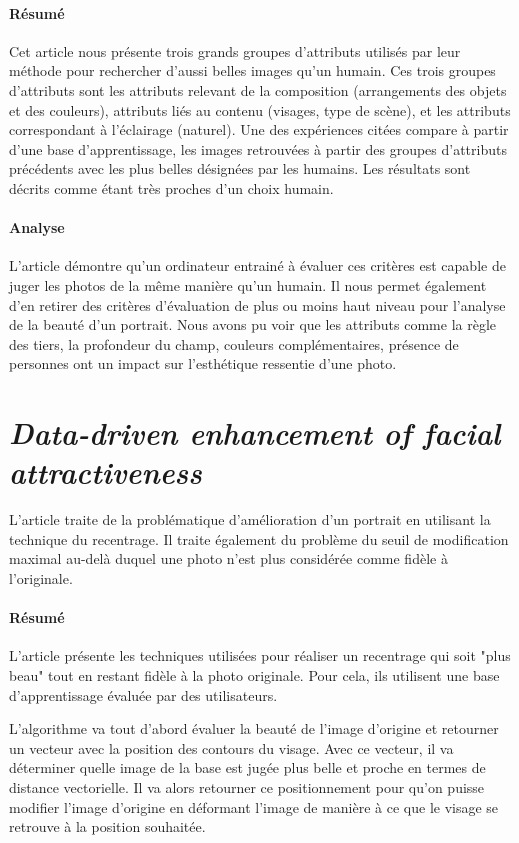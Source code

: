 \documentclass[11pt, french]{report-rd-info}
\begin{document}
\paragraph{Résumé}
Cet article nous présente trois grands groupes d'attributs utilisés par leur méthode pour rechercher d'aussi belles images qu'un humain.
Ces trois groupes d'attributs sont les attributs relevant de la composition (arrangements des objets et des couleurs), attributs liés au contenu (visages, type de scène), et les attributs correspondant à l'éclairage (naturel).
Une des expériences citées compare à partir d'une base d'apprentissage, les images retrouvées à partir des groupes d'attributs précédents avec les plus belles désignées par les humains. Les résultats sont décrits comme étant très proches d'un choix humain.

\paragraph{Analyse}
L'article démontre qu'un ordinateur entrainé à évaluer ces critères est capable de juger les photos de la même manière qu'un humain.
Il nous permet également d'en retirer des critères d'évaluation de plus ou moins haut niveau pour l'analyse de la beauté d'un portrait.
Nous avons pu voir que les attributs comme la règle des tiers, la profondeur du champ, couleurs complémentaires, présence de personnes ont un impact sur l'esthétique ressentie d'une photo.


\section{\emph{Data-driven enhancement of facial attractiveness}}
L'article \cite{Leyvand2008} traite de la problématique d'amélioration d'un portrait en utilisant la technique du recentrage. Il traite également du problème du seuil de modification maximal au-delà duquel une photo n'est plus considérée comme fidèle à l'originale.

\paragraph{Résumé}
L'article présente les techniques utilisées pour réaliser un recentrage qui soit "plus beau" tout en restant fidèle à la photo originale. Pour cela, ils utilisent une base d'apprentissage évaluée par des utilisateurs.

L'algorithme va tout d'abord évaluer la beauté de l'image d'origine et retourner un vecteur avec la position des contours du visage. Avec ce vecteur, il va déterminer quelle image de la base est jugée plus belle et proche en termes de distance vectorielle. Il va alors retourner ce positionnement pour qu'on puisse modifier l'image d'origine en déformant l'image de manière à ce que le visage se retrouve à la position souhaitée.
\end{document}
